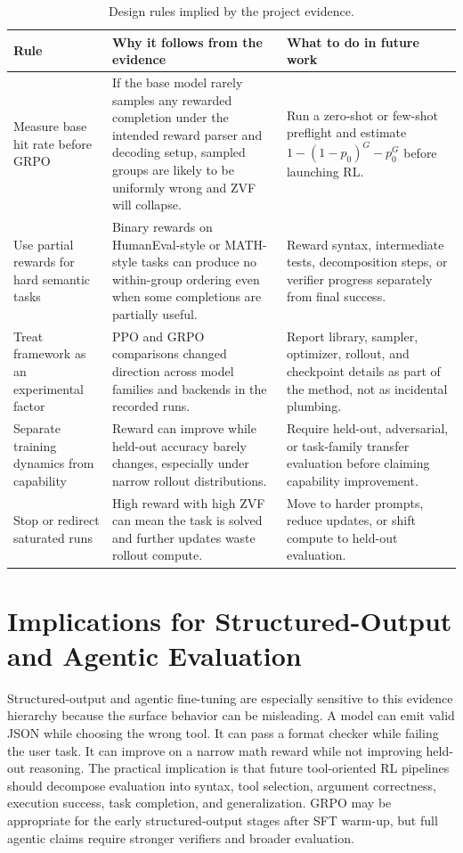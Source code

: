 \documentclass[12pt,a4paper]{report}
\begin{document}
\begin{table}[ht]
\centering
\caption{Design rules implied by the project evidence.}
\label{tab:design-rules}
\small
\footnotesize
\begin{tabularx}{\textwidth}{p{3.25cm}p{4.25cm}X}
\toprule
Rule & Why it follows from the evidence & What to do in future work\\
\midrule
Measure base hit rate before GRPO & If the base model rarely samples any rewarded completion under the intended reward parser and decoding setup, sampled groups are likely to be uniformly wrong and ZVF will collapse. & Run a zero-shot or few-shot preflight and estimate $1-(1-p_0)^G-p_0^G$ before launching RL.\\
Use partial rewards for hard semantic tasks & Binary rewards on HumanEval-style or MATH-style tasks can produce no within-group ordering even when some completions are partially useful. & Reward syntax, intermediate tests, decomposition steps, or verifier progress separately from final success.\\
Treat framework as an experimental factor & PPO and GRPO comparisons changed direction across model families and backends in the recorded runs. & Report library, sampler, optimizer, rollout, and checkpoint details as part of the method, not as incidental plumbing.\\
Separate training dynamics from capability & Reward can improve while held-out accuracy barely changes, especially under narrow rollout distributions. & Require held-out, adversarial, or task-family transfer evaluation before claiming capability improvement.\\
Stop or redirect saturated runs & High reward with high ZVF can mean the task is solved and further updates waste rollout compute. & Move to harder prompts, reduce updates, or shift compute to held-out evaluation.\\
\bottomrule
\end{tabularx}
\end{table}

\section{Implications for Structured-Output and Agentic Evaluation}
\label{sec:agentic-implications}

Structured-output and agentic fine-tuning are especially sensitive to this evidence hierarchy because the surface behavior can be misleading. A model can emit valid JSON while choosing the wrong tool. It can pass a format checker while failing the user task. It can improve on a narrow math reward while not improving held-out reasoning. The practical implication is that future tool-oriented RL pipelines should decompose evaluation into syntax, tool selection, argument correctness, execution success, task completion, and generalization. GRPO may be appropriate for the early structured-output stages after SFT warm-up, but full agentic claims require stronger verifiers and broader evaluation.
\end{document}
